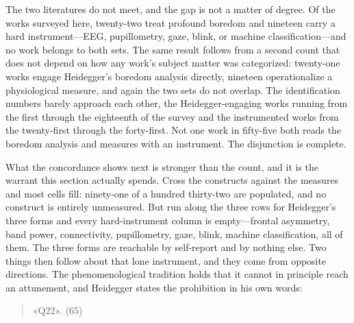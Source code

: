 The two literatures do not meet, and the gap is not a matter of degree. Of the works surveyed
here, twenty-two treat profound boredom and nineteen carry a hard instrument---EEG,
pupillometry, gaze, blink, or machine classification---and no work belongs to both sets. The
same result follows from a second count that does not depend on how any work's subject matter
was categorized: twenty-one works engage Heidegger's boredom analysis directly, nineteen
operationalize a physiological measure, and again the two sets do not overlap. The
identification numbers barely approach each other, the Heidegger-engaging works running from
the first through the eighteenth of the survey and the instrumented works from the
twenty-first through the forty-first. Not one work in fifty-five both reads the boredom
analysis and measures with an instrument. The disjunction is complete.

What the concordance shows next is stronger than the count, and it is the warrant this section
actually spends. Cross the constructs against the measures and most cells fill: ninety-one of a
hundred thirty-two are populated, and no construct is entirely unmeasured. But run along the
three rows for Heidegger's three forms and every hard-instrument column is empty---frontal
asymmetry, band power, connectivity, pupillometry, gaze, blink, machine classification, all of
them. The three forms are reachable by self-report and by nothing else. Two things then follow
about that lone instrument, and they come from opposite directions. The phenomenological
tradition holds that it cannot in principle reach an attunement, and Heidegger states the
prohibition in his own words:

\begin{quote}
«Q22». (65)
\end{quote}

